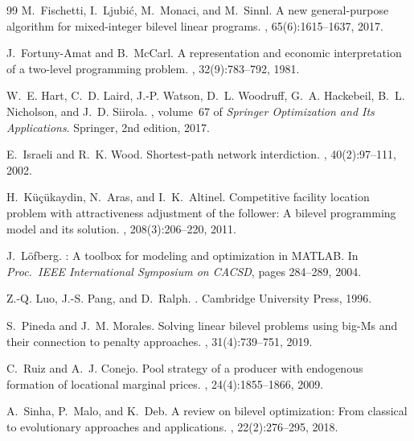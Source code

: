 \documentclass[11pt]{article}
\begin{document}
\begin{thebibliography}{99}
M.~Fischetti, I.~Ljubi{\'c}, M.~Monaci, and M.~Sinnl.
\newblock A new general-purpose algorithm for mixed-integer bilevel linear
  programs.
, 65(6):1615--1637, 2017.

J.~Fortuny-Amat and B.~McCarl.
\newblock A representation and economic interpretation of a two-level
  programming problem.
, 32(9):783--792,
  1981.

W.~E. Hart, C.~D. Laird, J.-P. Watson, D.~L. Woodruff, G.~A. Hackebeil,
  B.~L. Nicholson, and J.~D. Siirola.
, volume~67 of
  {\em Springer Optimization and Its Applications}.
\newblock Springer, 2nd edition, 2017.

E.~Israeli and R.~K. Wood.
\newblock Shortest-path network interdiction.
, 40(2):97--111, 2002.

H.~K{\"u}{\c{c}}{\"u}kaydin, N.~Aras, and I.~K.~Altinel.
\newblock Competitive facility location problem with attractiveness adjustment
  of the follower: A bilevel programming model and its solution.
, 208(3):206--220, 2011.

J.~L{\"o}fberg.
: A toolbox for modeling and optimization in {MATLAB}.
\newblock In {\em Proc.\ IEEE International Symposium on CACSD}, pages
  284--289, 2004.

Z.-Q. Luo, J.-S. Pang, and D.~Ralph.
.
\newblock Cambridge University Press, 1996.

S.~Pineda and J.~M. Morales.
\newblock Solving linear bilevel problems using big-{M}s and their connection
  to penalty approaches.
, 31(4):739--751, 2019.

C.~Ruiz and A.~J. Conejo.
\newblock Pool strategy of a producer with endogenous formation of locational
  marginal prices.
, 24(4):1855--1866, 2009.

A.~Sinha, P.~Malo, and K.~Deb.
\newblock A review on bilevel optimization: From classical to evolutionary
  approaches and applications.
, 22(2):276--295,
  2018.


\end{thebibliography}
\end{document}
